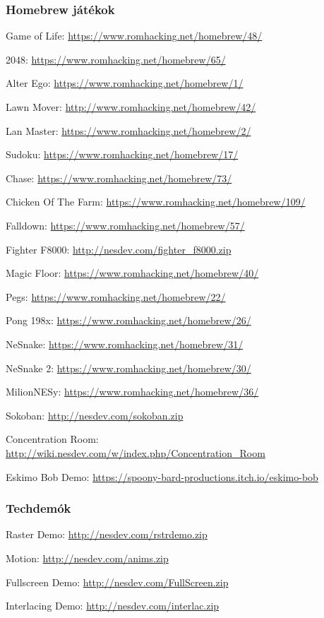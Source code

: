 \subsubsection{Homebrew játékok}
\begin{compactitem}
	\item Game of Life: \url{https://www.romhacking.net/homebrew/48/}
	\item 2048: \url{https://www.romhacking.net/homebrew/65/}
	\item Alter Ego: \url{https://www.romhacking.net/homebrew/1/} \label{alter}
	\item Lawn Mover: \url{http://www.romhacking.net/homebrew/42/} \label{lawn}
	\item Lan Master: \url{https://www.romhacking.net/homebrew/2/}
	\item Sudoku: \url{https://www.romhacking.net/homebrew/17/}
	\item Chase: \url{https://www.romhacking.net/homebrew/73/}
	\item Chicken Of The Farm: \url{https://www.romhacking.net/homebrew/109/}
	\item Falldown: \url{https://www.romhacking.net/homebrew/57/}
	\item Fighter F8000: \url{http://nesdev.com/fighter\_f8000.zip}
	\item Magic Floor: \url{https://www.romhacking.net/homebrew/40/}
	\item Pegs: \url{https://www.romhacking.net/homebrew/22/}
	\item Pong 198x: \url{https://www.romhacking.net/homebrew/26/}
	\item NeSnake: \url{https://www.romhacking.net/homebrew/31/}
	\item NeSnake 2: \url{https://www.romhacking.net/homebrew/30/}
	\item MilionNESy: \url{https://www.romhacking.net/homebrew/36/}
	\item Sokoban: \url{http://nesdev.com/sokoban.zip}
	\item Concentration Room: \newline \url{http://wiki.nesdev.com/w/index.php/Concentration_Room}
	\item Eskimo Bob Demo: \newline \url{https://spoony-bard-productions.itch.io/eskimo-bob}
\end{compactitem}

\subsubsection{Techdemók}
\begin{compactitem}
	\item Raster Demo: \url{http://nesdev.com/rstrdemo.zip}
	\item Motion: \url{http://nesdev.com/anims.zip}
	\item Fullscreen Demo: \url{http://nesdev.com/FullScreen.zip}
	\item Interlacing Demo: \url{http://nesdev.com/interlac.zip}
\end{compactitem}



